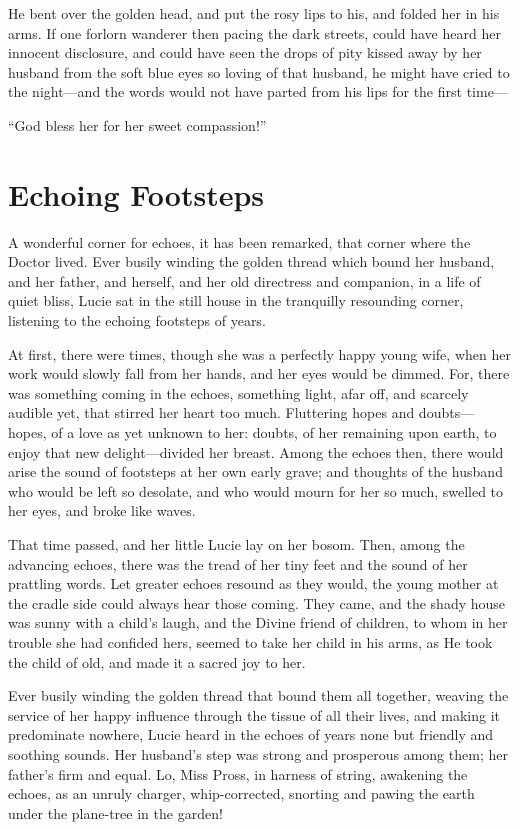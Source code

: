 He bent over the golden head, and put the rosy lips to his, and folded
her in his arms.  If one forlorn wanderer then pacing the dark streets,
could have heard her innocent disclosure, and could have seen the drops
of pity kissed away by her husband from the soft blue eyes so loving of
that husband, he might have cried to the night---and the words would not
have parted from his lips for the first time---%

``God bless her for her sweet compassion!''



\chapter{Echoing Footsteps}


A wonderful corner for echoes, it has been remarked, that corner where
the Doctor lived.  Ever busily winding the golden thread which bound
her husband, and her father, and herself, and her old directress and
companion, in a life of quiet bliss, Lucie sat in the still house in the
tranquilly resounding corner, listening to the echoing footsteps of years.

At first, there were times, though she was a perfectly happy young
wife, when her work would slowly fall from her hands, and her eyes
would be dimmed.  For, there was something coming in the echoes,
something light, afar off, and scarcely audible yet, that stirred
her heart too much.  Fluttering hopes and doubts---hopes, of a love as
yet unknown to her:  doubts, of her remaining upon earth, to enjoy that
new delight---divided her breast.  Among the echoes then, there would
arise the sound of footsteps at her own early grave; and thoughts of
the husband who would be left so desolate, and who would mourn for
her so much, swelled to her eyes, and broke like waves.

That time passed, and her little Lucie lay on her bosom.  Then,
among the advancing echoes, there was the tread of her tiny feet and
the sound of her prattling words.  Let greater echoes resound as they
would, the young mother at the cradle side could always hear those
coming.  They came, and the shady house was sunny with a child's laugh,
and the Divine friend of children, to whom in her trouble she had
confided hers, seemed to take her child in his arms, as He took the
child of old, and made it a sacred joy to her.

Ever busily winding the golden thread that bound them all together,
weaving the service of her happy influence through the tissue of all
their lives, and making it predominate nowhere, Lucie heard in the
echoes of years none but friendly and soothing sounds.  Her husband's
step was strong and prosperous among them; her father's firm and equal.
Lo, Miss Pross, in harness of string, awakening the echoes, as an
unruly charger, whip-corrected, snorting and pawing the earth under
the plane-tree in the garden!

